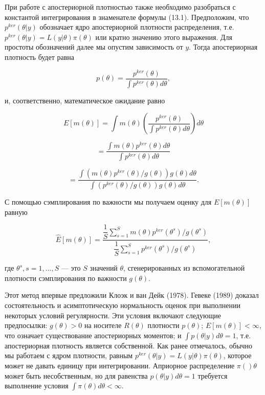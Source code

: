 При работе с апостериорной плотностью также необходимо разобраться с  константой интегрирования в знаменателе формулы (13.1). Предположим, что $p^{ker}(\theta|y)$ обозначает ядро апостериорной плотности распределения, т.е. $p^{ker}(\theta|y)=L(y|\theta)\pi(\theta)$ или кратно значению этого выражения. Для простоты обозначений далее мы опустим зависимость от $y$. Тогда апостериорная плотность будет равна

\[
p(\theta)=\dfrac{p^{ker}(\theta)}{\int{p^{ker}(\theta)d\theta}},
\]

и, соответственно, математическое ожидание равно

\[
E[m(\theta)]=\int{m(\theta)\left(\dfrac{p^{ker}(\theta)}{\int{p^{ker}(\theta)d\theta}}\right)d\theta}
\]

\[
=\frac{\int m(\theta)p^{ker}(\theta)d\theta}{{\int}p^{ker}(\theta)d\theta}
\]

\[
=\dfrac{{\int}(m(\theta)p^{ker}(\theta)/g(\theta))g(\theta)d\theta}{{\int}(p^{ker}(\theta)/g(\theta))g(\theta)d\theta}.
\]

С помощью сэмплирования по важности мы получаем оценку для $E[m(\theta)]$ равную

\begin{equation}
\hat{E}[m(\theta)]=\dfrac{\dfrac{1}{S}\sum^{S}_{s=1}m(\theta)p^{ker}(\theta^s)/g(\theta^s)}{\dfrac{1}{S}\sum^{S}_{s=1} p^{ker}(\theta^s)/g(\theta^s)},
\end{equation}

где $\theta^s, s=1,\ldots ,S$ --- это $S$ значений $\theta$, сгенерированных из вспомогательной плотности сэмплирования по важности $g(\theta)$.

Этот метод впервые предложили Клоэк и ван Дейк (1978). Гевеке (1989) доказал состоятельность и асимптотическую нормальность оценок при выполнении некоторых условий регулярности. 
Эти условия включают следующие предпосылки: $g(\theta)>0$ на носителе $R(\theta)$ плотности $p(\theta)$; $E[m(\theta)]<\infty$, что означает существование апостериорных моментов; и ${\int}p(\theta|y)d\theta=1$, т.е. апостериорная плотность является собственной. Как ранее отмечалось, обычно мы работаем с ядром  плотности, равным $p^{ker}(\theta|y)=L(y|\theta)\pi(\theta)$, которое может не давать единицу при интегрировании. 
Априорное распределение $\pi()\theta$ может быть несобственным, но для равенства $p(\theta|y)d\theta=1$ требуется выполнение условия ${\int}\pi(\theta)d\theta<\infty$.

